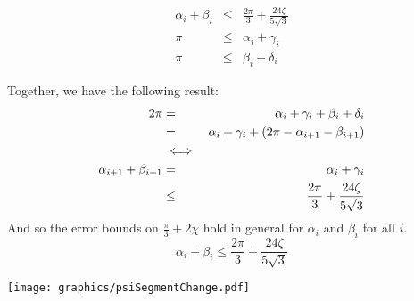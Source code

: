 $$
\begin{array}{rcl}
\alpha_i +\beta_i &\leq& \frac{2 \pi}{3} + \frac{24 \zeta}{5\sqrt3}\\
\pi &\leq& \alpha_i + \gamma_i \\
\pi &\leq& \beta_i + \delta_i
\end{array}
$$

Together, we have the following result:
\begin{eqnarray*}
2\pi &=& \alpha_i + \gamma_i + \beta_i + \delta_i\\
 &=& \alpha_i + \gamma_i + \left( 2\pi - \alpha_{i+1} - \beta_{i+1} \right)\\
 &\iff&\\
\alpha_{i+1} + \beta_{i+1}&=&\alpha_i + \gamma_i \\
&\leq& \frac{2\pi}{3} + \frac{24\zeta}{5\sqrt{3}}\\
\end{eqnarray*}
And so the error bounds on $\frac{\pi}{3}+2\chi$ hold in general for $\alpha_i$ and $\beta_i$ for all $i$.  
$$\alpha_i + \beta_i \leq \frac{2\pi}{3} + \frac{24\zeta}{5\sqrt{3}}$$

\begin{minipage}{\linewidth}
\begin{center}
\texttt{[image: graphics/psiSegmentChange.pdf]}
\label{fig:psiSegmentChange.pdf}
\end{center}
\end{minipage}

